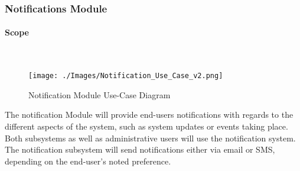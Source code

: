 \documentclass{article}
\begin{document}
		\subsubsection{Notifications Module}
			\paragraph	{Scope}\mbox{} \\
				\begin{figure}[h]
					\texttt{[image: ./Images/Notification\_Use\_Case\_v2.png]} 
					\caption{Notification Module Use-Case Diagram}
				\end{figure}
			
				{The notification Module will provide end-users notifications with regards to the different aspects of the system, such as system updates or events taking place. Both subsystems as well as administrative users will use the notification system. The notification subsystem will send notifications either via email or SMS, depending on the end-user's noted preference.}		
		
			\newpage
\end{document}
